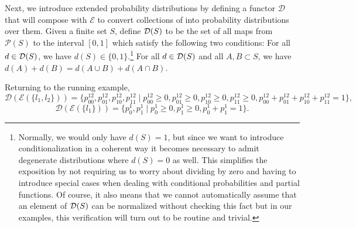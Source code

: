 Next, we introduce extended probability distributions by defining a functor $\mathcal{D}$ that will compose with $\mathcal{E}$ to convert collections of \gnpm{} into probability distributions over them.  Given a finite set $S$, define $\mathcal{D}(S)$ to be the set of all maps from $\mathcal{P}(S)$ to the interval $[0,1]$ which satisfy the following two conditions:  For all $d \in \mathcal{D}(S)$, we have $d(S) \in \{0,1\}$.\footnote{Normally, we would only have $d(S) = 1$, but since we want to introduce conditionalization in a coherent way it becomes necessary to admit degenerate distributions where $d(S) = 0$ as well. This simplifies the exposition by not requiring us to worry about dividing by zero and having to introduce special cases when dealing with conditional probabilities and partial functions.  Of course, it also means that we cannot automatically assume that an element of $\mathcal{D}(S)$ can be normalized without checking this fact but in our examples, this verification will turn out to be routine and trivial.}  For all  $d \in \mathcal{D}(S)$ and all $A, B \subset S$, we have $d(A) + d(B) = d(A \cup B) + d(A \cap B)$.

Returning to the running example,
$$\mathcal{D}(\mathcal{E}(\{l_1,l_2\})) = \{p^{12}_{00},p^{12}_{01},p^{12}_{10},p^{12}_{11} \mid p^{12}_{00} \geq 0, p^{12}_{01} \geq 0,p^{12}_{10} \geq 0,p^{12}_{11} \geq 0, p^{12}_{00} + p^{12}_{01} + p^{12}_{10} + p^{12}_{11} = 1 \},$$
$$\mathcal{D}(\mathcal{E}(\{l_1\})) = \{p^{1}_{0}, p^{1}_{1} \mid p^{1}_{0} \geq 0, p^{1}_{1} \geq 0, p^{1}_{0}+p^{1}_{1} = 1 \}.$$

